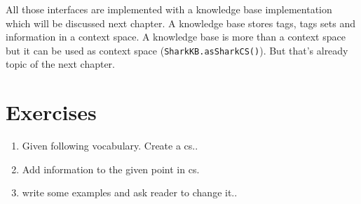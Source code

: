 All those interfaces are implemented with a knowledge base implementation which will be discussed next chapter. A knowledge base stores tags, tags sets and information in a context space. A knowledge base is more than a context space but it can be used as context space ({\tt SharkKB.asSharkCS()}). But that's already topic of the next chapter.

\section{Exercises}
\begin{enumerate}
\item
Given following vocabulary. Create a cs..
\item
Add information to the given point in cs.
\item
write some examples and ask reader to change it..
\end{enumerate}
